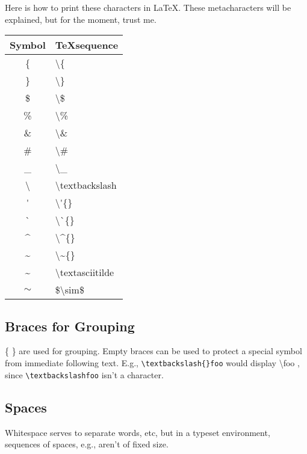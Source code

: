 Here is how to print these characters in \LaTeX{}.  These metacharacters
will be explained, but for the moment, trust me.

\begin{center}
	\begin{tabular}{|c|l|}
		\hline
			\bf{Symbol} & \bf{\TeX sequence} \\
		\hline
			\{ & \textbackslash{}\{ \\
		\hline
			\} & \textbackslash{}\} \\
		\hline
			\$ & \textbackslash{}\$ \\
		\hline
			\% & \textbackslash{}\% \\
		\hline
			\& & \textbackslash{}\& \\
		\hline
			\# & \textbackslash{}\# \\
		\hline
			\_ & \textbackslash{}\_ \\
		\hline
			\textbackslash & \textbackslash{}textbackslash \\
		\hline
			\'{} & \textbackslash{}\'{}\{\} \\
		\hline
			\`{} & \textbackslash{}\`{}\{\} \\
		\hline
			\^{} & \textbackslash{}\^{}\{\} \\
		\hline
			\~{} & \textbackslash{}\~{}\{\} \\
			\textasciitilde & \textbackslash{}textasciitilde \\
			$\sim$ & \$\textbackslash{}sim\$ \\
		\hline
	\end{tabular}
\end{center}


\subsection{Braces for Grouping}

\{ \} are used for grouping.  Empty braces can be used to protect a special
symbol from immediate following text.  E.g.,
\texttt{\textbackslash{}textbackslash\{\}foo} would display
\textbackslash{}foo , since \texttt{\textbackslash{}textbackslashfoo} isn't
a character.


\subsection{Spaces}

Whitespace serves to separate words, etc, but in a typeset environment,
sequences of spaces, e.g., aren't of fixed size.


